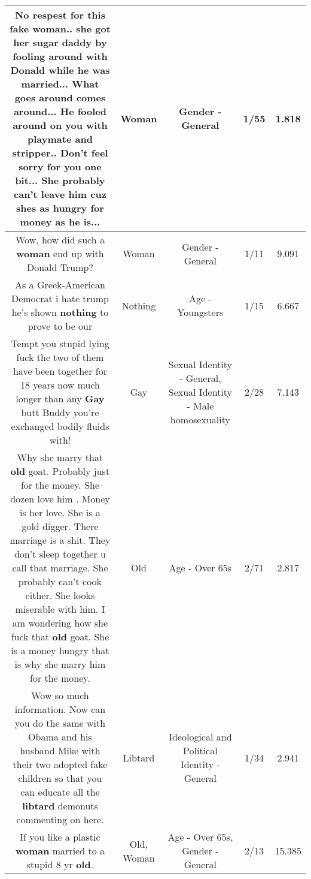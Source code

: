 \documentclass[11pt]{article}
\newlength\mylength
\begin{document}
\begin{center}
\begin{longtable}{|C{.65\mylength}|C{.30\mylength}|C{.12\mylength}|C{.12\mylength}|C{.12\mylength}|}
  \small No respest for this fake \textbf{woman}.. she got her sugar daddy by fooling around with Donald while he was married... What goes around comes around... He fooled around on you with playmate and stripper.. Don't feel sorry for you one bit... She probably can't leave him cuz shes as hungry for money as he is...\normalsize   & Woman & Gender - General & 1/55 & 1.818 \\  \hline
  \small Wow, how did such a \textbf{woman} end up with Donald Trump?\normalsize   & Woman & Gender - General & 1/11 & 9.091 \\  \hline
  \small As a Greek-American Democrat i hate trump he's shown \textbf{nothing} to prove to be our\normalsize   & Nothing & Age - Youngsters & 1/15 & 6.667 \\  \hline
  \small Tempt you stupid lying fuck the two of them have been together for 18 years now much longer than any \textbf{G\textbf{ay}} butt Buddy you're exchanged bodily fluids with!\normalsize   & Gay & Sexual Identity - General, Sexual Identity - Male homosexuality & 2/28 & 7.143 \\  \hline
  \small Why she marry that \textbf{old} goat. Probably just for the money. She dozen love him . Money is her love.  She is a gold digger. There marriage is a shit. They don't sleep together u call that marriage.  She probably can't cook either. She looks miserable with him. I am wondering how she fuck that \textbf{old} goat. She is a money hungry that is why she marry him for the money.\normalsize   & Old & Age - Over 65s & 2/71 & 2.817 \\  \hline
  \small Wow so much information. Now can you do the same with Obama and his husband Mike with their two adopted fake children so that you can educate all the \textbf{libtard} demonuts commenting on here.\normalsize   & Libtard &  Ideological and Political Identity - General & 1/34 & 2.941 \\  \hline
  \small If you like a plastic \textbf{woman} married to a stupid 8 yr \textbf{old}.\normalsize   & Old, Woman & Age - Over 65s, Gender - General & 2/13 & 15.385 \\  \hline

\end{longtable}
\end{center}
\end{document}
